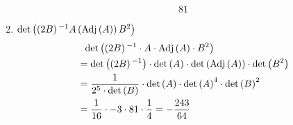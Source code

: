 \begin{enumerate}[label=\listAlph]
\[                81
            \]
        \item \(\det\left(\left(2B\right){}^{-1} A\left(\text{Adj}\left(A\right)\right)B^2\right)\)
            \[
                \begin{aligned}
                    &\phantom{=} \text{det} \left( \left(2B\right){}^{-1} \cdot A \cdot \text{Adj} \left( A \right) \cdot B^2 \right) \\
                    &= \text{det} \left( \left(2B\right){}^{-1} \right) \cdot \text{det} \left( A \right) \cdot \text{det} \left( \text{Adj} \left( A \right) \right) \cdot \text{det} \left( B^2 \right) \\
                    &= \frac{1}{2^5 \cdot \text{det} \left( B \right)} \cdot \text{det} \left( A \right) \cdot \text{det} \left( A \right)^{4} \cdot \text{det} \left( B \right)^2 \\
                    &= \frac{1}{16} \cdot -3 \cdot 81 \cdot \frac{1}{4}
                    = -\frac{243}{64}
                \end{aligned}
            \]
    \end{enumerate}
